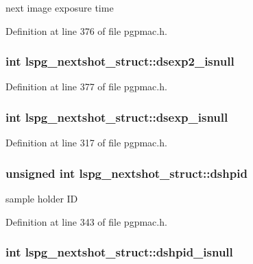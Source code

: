 next image exposure time 



Definition at line 376 of file pgpmac.\-h.

\hypertarget{structlspg__nextshot__struct_a45091283dc073e5b7da2cfbe5a75fade}{
\subsubsection[{dsexp2\-\_\-isnull}]{\setlength{\rightskip}{0pt plus 5cm}int lspg\-\_\-nextshot\-\_\-struct\-::dsexp2\-\_\-isnull}}\label{structlspg__nextshot__struct_a45091283dc073e5b7da2cfbe5a75fade}


Definition at line 377 of file pgpmac.\-h.

\hypertarget{structlspg__nextshot__struct_ae07498f62ea9c0e2f702b78c87500794}{
\subsubsection[{dsexp\-\_\-isnull}]{\setlength{\rightskip}{0pt plus 5cm}int lspg\-\_\-nextshot\-\_\-struct\-::dsexp\-\_\-isnull}}\label{structlspg__nextshot__struct_ae07498f62ea9c0e2f702b78c87500794}


Definition at line 317 of file pgpmac.\-h.

\hypertarget{structlspg__nextshot__struct_a5e260a420176f2973cdb100d0a5c4c09}{
\subsubsection[{dshpid}]{\setlength{\rightskip}{0pt plus 5cm}unsigned int lspg\-\_\-nextshot\-\_\-struct\-::dshpid}}\label{structlspg__nextshot__struct_a5e260a420176f2973cdb100d0a5c4c09}


sample holder I\-D 



Definition at line 343 of file pgpmac.\-h.

\hypertarget{structlspg__nextshot__struct_afe16be0382423aa3f25cb3d6cf99430b}{
\subsubsection[{dshpid\-\_\-isnull}]{\setlength{\rightskip}{0pt plus 5cm}int lspg\-\_\-nextshot\-\_\-struct\-::dshpid\-\_\-isnull}}\label{structlspg__nextshot__struct_afe16be0382423aa3f25cb3d6cf99430b}


